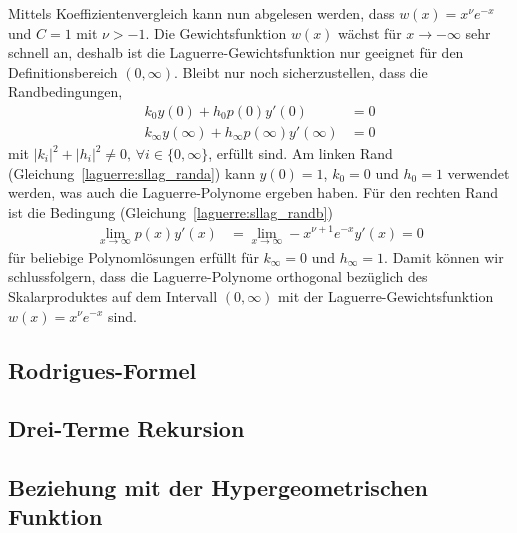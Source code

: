 Mittels Koeffizientenvergleich kann nun abgelesen werden, dass $w(x) = x^\nu
e^{-x}$ und $C=1$ mit $\nu > -1$.
Die Gewichtsfunktion $w(x)$ wächst für $x\rightarrow-\infty$ sehr schnell an,
deshalb ist die Laguerre-Gewichtsfunktion nur geeignet für den
Definitionsbereich $(0, \infty)$.
Bleibt nur noch sicherzustellen, dass die Randbedingungen,
\begin{align}
k_0 y(0) + h_0 p(0)y'(0)
 & =
0
\label{laguerre:sllag_randa}
\\
k_\infty y(\infty) + h_\infty p(\infty) y'(\infty)
 & =
0
\label{laguerre:sllag_randb}
\end{align}
mit $|k_i|^2 + |h_i|^2 \neq 0,\,\forall i \in \{0, \infty\}$, erfüllt sind.
Am linken Rand (Gleichung~\eqref{laguerre:sllag_randa}) kann $y(0) = 1$, $k_0 =
0$ und $h_0 = 1$ verwendet werden,
was auch die Laguerre-Polynome ergeben haben.
Für den rechten Rand ist die Bedingung (Gleichung~\eqref{laguerre:sllag_randb})
\begin{align*}
\lim_{x \rightarrow \infty} p(x) y'(x)
 & =
\lim_{x \rightarrow \infty} -x^{\nu + 1} e^{-x} y'(x)
=
0
\end{align*}
für beliebige Polynomlösungen erfüllt für $k_\infty=0$ und $h_\infty=1$.
Damit können wir schlussfolgern, dass die Laguerre-Polynome orthogonal
bezüglich des Skalarproduktes auf dem Intervall $(0, \infty)$ mit der Laguerre\--Gewichtsfunktion 
$w(x)=x^\nu e^{-x}$ sind.


\subsection{Rodrigues-Formel}

\subsection{Drei-Terme Rekursion}

\subsection{Beziehung mit der Hypergeometrischen Funktion}

